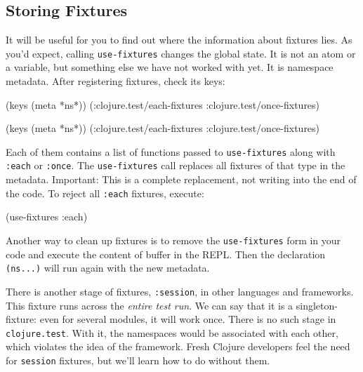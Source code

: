 \subsection{Storing Fixtures}

It will be useful for you to find out where the information about fixtures lies. As you'd expect, calling \verb|use-fixtures| changes the global state. It is not an atom or a variable, but something else we have not worked with yet. It is namespace metadata. After registering fixtures, check its keys:


\ifnarrow

\begin{english}
  \begin{clojure}
(keys (meta *ns*))
(:clojure.test/each-fixtures
 :clojure.test/once-fixtures)
  \end{clojure}
\end{english}

\else

\begin{english}
  \begin{clojure}
(keys (meta *ns*))
(:clojure.test/each-fixtures :clojure.test/once-fixtures)
  \end{clojure}
\end{english}

\fi

Each of them contains a list of functions passed to \verb|use-fixtures| along with \verb|:each| or \verb|:once|. The \verb|use-fixtures| call replaces all fixtures of that type in the metadata. Important: This is a complete replacement, not writing into the end of the code. To reject all \verb|:each| fixtures, execute:

\begin{english}
  \begin{clojure}
(use-fixtures :each)
  \end{clojure}
\end{english}

Another way to clean up fixtures is to remove the \verb|use-fixtures| form in your code and execute the content of buffer in the REPL. Then the declaration \verb|(ns...)| will run again with the new metadata.

There is another stage of fixtures, \verb|:session|, in other languages and frameworks. This fixture runs across the \emph{entire test run}. We can say that it is a singleton-fixture: even for several modules, it will work once. There is no such stage in \verb|clojure.test|. With it, the namespaces would be associated with each other, which violates the idea of the framework. Fresh Clojure developers feel the need for \verb|session| fixtures, but we'll learn how to do without them.


